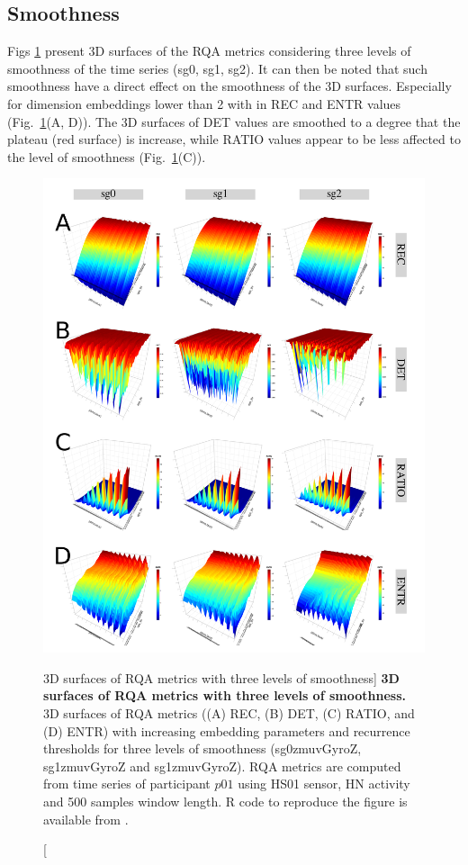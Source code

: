 \subsection{Smoothness}
Figs \ref{fig:topo_smoothness} present 3D surfaces of the RQA metrics
considering three levels of smoothness of the time series (sg0, sg1, sg2).
It can then be noted that such smoothness have a direct effect on the 
smoothness of the 3D surfaces.
Especially for dimension embeddings lower than 2 with in REC and ENTR values 
(Fig.~\ref{fig:topo_smoothness}(A, D)).
The 3D surfaces of DET values are smoothed to a degree that the plateau 
(red surface) is increase, while RATIO values appear to be less 
affected to the level of smoothness (Fig.~\ref{fig:topo_smoothness}(C)).
\begin{figure}
\centering
\includegraphics[width=1.0\textwidth]{s}
    \caption
	[3D surfaces of RQA metrics with three levels of smoothness]{
	{\bf 3D surfaces of RQA metrics with three levels of smoothness.}
	3D surfaces of RQA metrics ((A) REC, (B) DET, (C) RATIO, and (D) ENTR) 
	with increasing embedding parameters and recurrence thresholds for 
	three levels of smoothness 
	(sg0zmuvGyroZ, sg1zmuvGyroZ and sg1zmuvGyroZ).
	RQA metrics are computed from time series of participant $p01$ using 
	HS01 sensor, HN activity and 500 samples window length.
	R code to reproduce the figure is available from \cite{hwum2018}.
 }
\label{fig:topo_smoothness}
\end{figure}



